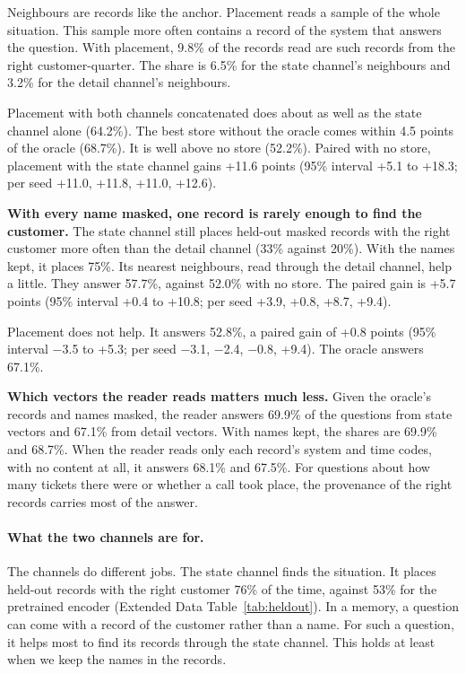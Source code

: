 \documentclass[11pt]{article}
\begin{document}
Neighbours are records like the anchor. Placement reads a sample of the whole situation. This sample more often contains a record of the system that answers the question. With placement, 9.8\% of the records read are such records from the right customer-quarter. The share is 6.5\% for the state channel's neighbours and 3.2\% for the detail channel's neighbours.

Placement with both channels concatenated does about as well as the state channel alone (64.2\%). The best store without the oracle comes within 4.5 points of the oracle (68.7\%). It is well above no store (52.2\%). Paired with no store, placement with the state channel gains +11.6 points (95\% interval +5.1 to +18.3; per seed +11.0, +11.8, +11.0, +12.6).

\textbf{With every name masked, one record is rarely enough to find the customer.} The state channel still places held-out masked records with the right customer more often than the detail channel (33\% against 20\%). With the names kept, it places 75\%. Its nearest neighbours, read through the detail channel, help a little. They answer 57.7\%, against 52.0\% with no store. The paired gain is +5.7 points (95\% interval +0.4 to +10.8; per seed +3.9, +0.8, +8.7, +9.4).

Placement does not help. It answers 52.8\%, a paired gain of +0.8 points (95\% interval $-$3.5 to +5.3; per seed $-$3.1, $-$2.4, $-$0.8, +9.4). The oracle answers 67.1\%.

\textbf{Which vectors the reader reads matters much less.} Given the oracle's records and names masked, the reader answers 69.9\% of the questions from state vectors and 67.1\% from detail vectors. With names kept, the shares are 69.9\% and 68.7\%. When the reader reads only each record's system and time codes, with no content at all, it answers 68.1\% and 67.5\%. For questions about how many tickets there were or whether a call took place, the provenance of the right records carries most of the answer.

\paragraph{What the two channels are for.} The channels do different jobs. The state channel finds the situation. It places held-out records with the right customer 76\% of the time, against 53\% for the pretrained encoder (Extended Data Table~\ref{tab:heldout}). In a memory, a question can come with a record of the customer rather than a name. For such a question, it helps most to find its records through the state channel. This holds at least when we keep the names in the records.
\end{document}
